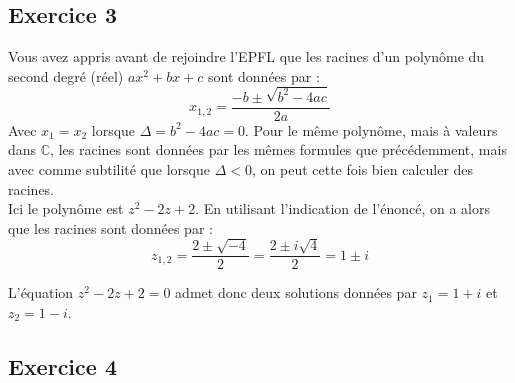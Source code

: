 \documentclass{article}
\begin{document}
\subsection{Exercice 3}
Vous avez appris avant de rejoindre l'EPFL que les racines d'un polynôme du second degré (réel) $ax^2+bx +c$ sont données par :
\begin{equation*}
    x_{1,2} = \dfrac{-b\pm\sqrt{b^2-4ac}}{2a}
\end{equation*}
Avec $x_1 = x_2$ lorsque $\Delta = b^2-4ac = 0$. Pour le même polynôme, mais à valeurs dans	$\mathbb{C}$, les racines sont données par les mêmes formules que précédemment, mais avec comme subtilité que lorsque $\Delta < 0$, on peut cette fois bien calculer des racines.  \\
Ici le polynôme est $z^2-2z+2$. En utilisant l'indication de l'énoncé, on a alors que les racines sont données par :
\begin{equation*}
    z_{1,2} = \dfrac{2\pm\sqrt{-4}}{2}=\dfrac{2\pm i\sqrt{4}}{2} = 1\pm i
\end{equation*}

\noindent L'équation $z^2-2z+2 = 0$ admet donc deux solutions données par $z_1= 1+i$ et $z_2 = 1-i$. 



\subsection{Exercice 4}
\end{document}
